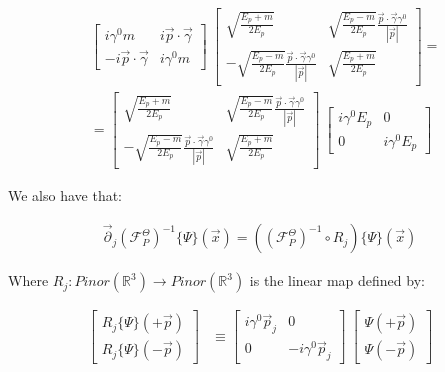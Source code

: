 \documentclass[11pt]{book}
\begin{document}
\begin{equation}\begin{aligned}
&\left[ \begin{array}{cc}
i\gamma^0 m 
& i\vec{p}\cdot \vec{\gamma}\\
-i\vec{p}\cdot \vec{\gamma}
& i\gamma^0 m
\end{array}
\right]\ 
\left[ \begin{array}{cc}
\sqrt{\frac{E_p+m}{2E_p}} 
& \sqrt{\frac{E_p-m}{2E_p}}\frac{\vec{p}\cdot\vec{\gamma}\gamma^0}{|\vec{p}|}\\
-\sqrt{\frac{E_p-m}{2E_p}}\frac{\vec{p}\cdot\vec{\gamma}\gamma^0}{|\vec{p}|}
&\sqrt{\frac{E_p+m}{2E_p}}
\end{array}
\right]=\\
&=\left[ \begin{array}{cc}
\sqrt{\frac{E_p+m}{2E_p}} 
& \sqrt{\frac{E_p-m}{2E_p}}\frac{\vec{p}\cdot\vec{\gamma}\gamma^0}{|\vec{p}|}\\
-\sqrt{\frac{E_p-m}{2E_p}}\frac{\vec{p}\cdot\vec{\gamma}\gamma^0}{|\vec{p}|}
&\sqrt{\frac{E_p+m}{2E_p}}
\end{array}\right]\ 
 \left[ \begin{array}{cc}
 i\gamma^0 E_p & 0\\
 0 & i\gamma^0 E_p
 \end{array}
 \right]\end{aligned}\end{equation}

We also have that:

\begin{equation}\begin{aligned}
\vec{\partial}_j(\mathcal{F}^\Theta_P)^{-1}\{\Psi\}(\vec{x})=((\mathcal{F}^\Theta_P)^{-1}\circ R_j) \{\Psi\}(\vec{x})\end{aligned}\end{equation}

Where \(R_j:Pinor(\mathbb{R}^3)\to Pinor(\mathbb{R}^3)\) is the linear
map defined by:

\begin{equation}\begin{aligned}
\left[ \begin{array}{l}
R_j\{\Psi\}(+\vec{p})\\
R_j\{\Psi\}(-\vec{p})
\end{array}
\right]&\equiv
\left[ \begin{array}{cc}
i\gamma^0 \vec{p}_j 
& 0\\
0
& -i\gamma^0 \vec{p}_j 
\end{array}
\right]\ 
\left[ \begin{array}{l}
\Psi(+\vec{p})\\
\Psi(-\vec{p})
\end{array}
\right]\end{aligned}\end{equation}
\end{document}
